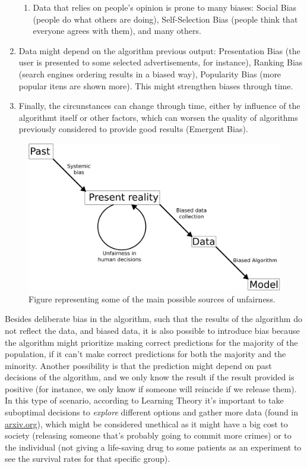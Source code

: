 \begin{enumerate}
\begin{enumerate}
    \item Data that relies on people's opinion is prone to many biases: Social Bias (people do what others are doing), Self-Selection Bias (people think that everyone agrees with them), and many others.
    \end{enumerate}
\item Data might depend on the algorithm previous output: Presentation Bias (the user is presented to some selected advertisements, for instance), Ranking Bias (search engines ordering results in a biased way), Popularity Bias (more popular itens are shown more). This might strengthen biases through time. 
\item Finally, the circunstances can change through time, either by influence of the algorithmt itself or other factors, which can worsen the quality of algorithms previously considered to provide good results (Emergent Bias).
\end{enumerate}



\begin{figure}[ht]
\centering
\includegraphics[width=\textwidth]{whereUnfair}
\caption{Figure representing some of the main possible sources of unfairness.}\label{fig:whereUnfair}
\end{figure}

Besides deliberate bias in the algorithm, such that the results of the algorithm do not reflect the data, and biased data, it is also possible to introduce bias because the algorithm might prioritize making correct predictions for the majority of the population, if it can't make correct predictions for both the majority and the minority. Another possibility is that the prediction might depend on past decisions of the algorithm, and we only know the result if the result provided is positive (for instance, we only know if someone will reincide if we release them). In this type of scenario, according to Learning Theory it's important to take suboptimal decisions to \emph{explore} different options and gather more data \cite{chouldechova2018frontiers} (found in \url{arxiv.org}), which might be considered unethical as it might have a big cost to society (releasing someone that's probably going to commit more crimes) or to the individual (not giving a life-saving drug to some patients as an experiment to see the survival rates for that specific group). 


